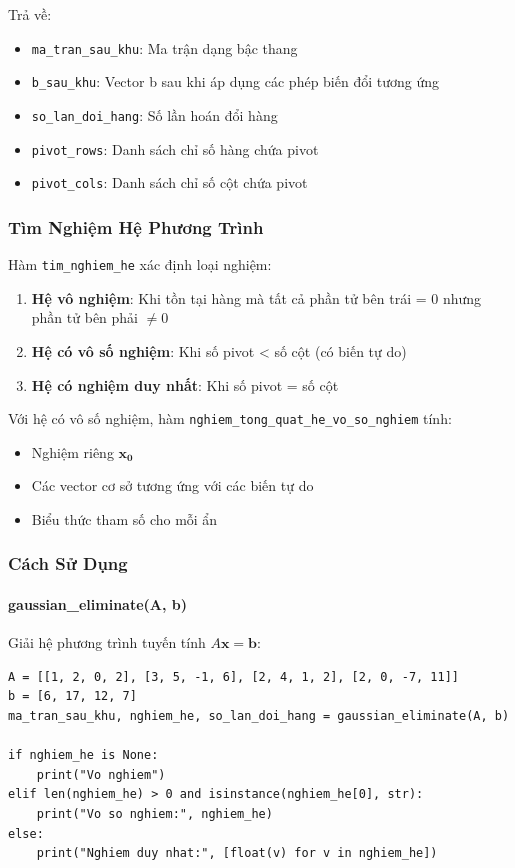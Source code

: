\documentclass[12pt, a4paper, twoside]{article}
\begin{document}
Trả về:
\begin{itemize}
    \item \texttt{ma\_tran\_sau\_khu}: Ma trận dạng bậc thang
    \item \texttt{b\_sau\_khu}: Vector b sau khi áp dụng các phép biến đổi tương ứng
    \item \texttt{so\_lan\_doi\_hang}: Số lần hoán đổi hàng
    \item \texttt{pivot\_rows}: Danh sách chỉ số hàng chứa pivot
    \item \texttt{pivot\_cols}: Danh sách chỉ số cột chứa pivot
\end{itemize}

\subsubsection{Tìm Nghiệm Hệ Phương Trình}

Hàm \texttt{tim\_nghiem\_he} xác định loại nghiệm:

\begin{enumerate}
    \item \textbf{Hệ vô nghiệm}: Khi tồn tại hàng mà tất cả phần tử bên trái = 0 nhưng phần tử bên phải $\neq 0$
    \item \textbf{Hệ có vô số nghiệm}: Khi số pivot < số cột (có biến tự do)
    \item \textbf{Hệ có nghiệm duy nhất}: Khi số pivot = số cột
\end{enumerate}

Với hệ có vô số nghiệm, hàm \texttt{nghiem\_tong\_quat\_he\_vo\_so\_nghiem} tính:
\begin{itemize}
    \item Nghiệm riêng $\mathbf{x_0}$
    \item Các vector cơ sở tương ứng với các biến tự do
    \item Biểu thức tham số cho mỗi ẩn
\end{itemize}

\subsubsection{Cách Sử Dụng}

\paragraph{gaussian\_eliminate(A, b)}
Giải hệ phương trình tuyến tính $A\mathbf{x} = \mathbf{b}$:

\begin{lstlisting}
A = [[1, 2, 0, 2], [3, 5, -1, 6], [2, 4, 1, 2], [2, 0, -7, 11]]
b = [6, 17, 12, 7]
ma_tran_sau_khu, nghiem_he, so_lan_doi_hang = gaussian_eliminate(A, b)

if nghiem_he is None:
    print("Vo nghiem")
elif len(nghiem_he) > 0 and isinstance(nghiem_he[0], str):
    print("Vo so nghiem:", nghiem_he)
else:
    print("Nghiem duy nhat:", [float(v) for v in nghiem_he])
\end{lstlisting}
\end{document}
